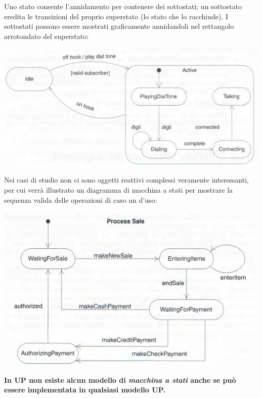 \documentclass[a4paper,12pt, oneside]{book}
\begin{document}
Uno stato consente l'annidamento per contenere dei sottostati; un sottostato eredita le transizioni del proprio superstato (lo stato che lo racchiude). I sottostati possono essere mostrati graficamente annidandoli nel rettangolo arrotondato del superstato:
\begin{center}
	\includegraphics[scale=0.6]{img/stad3.png}
\end{center}
Nei casi di studio non ci sono oggetti reattivi complessi veramente interessanti, per cui
verrà illustrato un diagramma di macchina a stati per mostrare la sequenza valida delle
operazioni di caso un d'uso:
\begin{center}
	\includegraphics[scale=0.6]{img/statd3.png}
\end{center}
\textbf{In UP non esiste alcun modello di \textit{macchina a stati} anche se può essere implementata in qualsiasi modello UP.}
\end{document}
